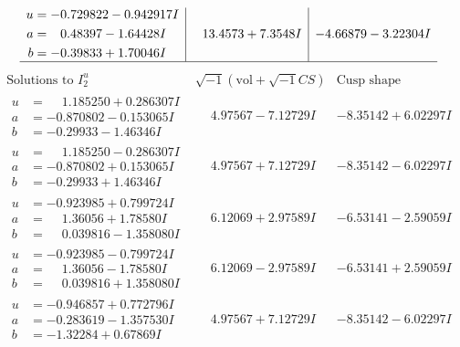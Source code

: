 \documentclass[1p]{elsarticle_modified}
\theoremstyle{definition}
\newcommand{\I}{\sqrt{-1}}
\begin{document}
$$\begin{array}{c|c|c}
\begin{aligned}
u &= -0.729822 - 0.942917 I \\
a &= \phantom{-}0.48397 - 1.64428 I \\
b &= -0.39833 + 1.70046 I\end{aligned}
 & \phantom{-}13.4573 + 7.3548 I & -4.66879 - 3.22304 I\\
 \hline 
 \end{array}$$\newpage$$\begin{array}{c|c|c}  
\text{Solutions to }I^u_{2}& \I (\text{vol} + \sqrt{-1}CS) & \text{Cusp shape}\\
 \hline 
\begin{aligned}
u &= \phantom{-}1.185250 + 0.286307 I \\
a &= -0.870802 - 0.153065 I \\
b &= -0.29933 - 1.46346 I\end{aligned}
 & \phantom{-}4.97567 - 7.12729 I & -8.35142 + 6.02297 I \\ \hline\begin{aligned}
u &= \phantom{-}1.185250 - 0.286307 I \\
a &= -0.870802 + 0.153065 I \\
b &= -0.29933 + 1.46346 I\end{aligned}
 & \phantom{-}4.97567 + 7.12729 I & -8.35142 - 6.02297 I \\ \hline\begin{aligned}
u &= -0.923985 + 0.799724 I \\
a &= \phantom{-}1.36056 + 1.78580 I \\
b &= \phantom{-}0.039816 - 1.358080 I\end{aligned}
 & \phantom{-}6.12069 + 2.97589 I & -6.53141 - 2.59059 I \\ \hline\begin{aligned}
u &= -0.923985 - 0.799724 I \\
a &= \phantom{-}1.36056 - 1.78580 I \\
b &= \phantom{-}0.039816 + 1.358080 I\end{aligned}
 & \phantom{-}6.12069 - 2.97589 I & -6.53141 + 2.59059 I \\ \hline\begin{aligned}
u &= -0.946857 + 0.772796 I \\
a &= -0.283619 - 1.357530 I \\
b &= -1.32284 + 0.67869 I\end{aligned}
 & \phantom{-}4.97567 + 7.12729 I & -8.35142 - 6.02297 I \\ \hline\begin{aligned}

\end{aligned}
\end{array}$$
\end{document}
